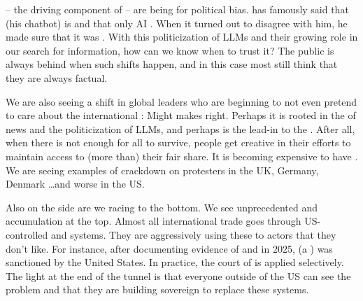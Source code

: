  -- the driving component of  -- are being  for political bias.  has famously said that  (his chatbot) is  and that only AI . When it turned out to disagree with him, he made sure that it was . With this politicization of LLMs and their growing role in our search for information, how can we know when to trust it? The public is always behind when such shifts happen, and in this case most still think that they are always factual.

We are also seeing a shift in global leaders who are beginning to not even pretend to care about the international : Might makes right. Perhaps it is rooted in the  of news and the politicization of LLMs, and perhaps is the lead-in to the . After all, when there is not enough  for all to survive, people get creative in their efforts to maintain access to (more than) their fair share. It is becoming expensive to have . We are seeing examples of  crackdown on protesters in the UK, Germany, Denmark \ldots and worse in the US.

Also on the  side are we racing to the bottom. We see unprecedented  and  accumulation at the top. Almost all international trade goes through US-controlled  and  systems. They are aggressively using these to  actors that they don't like. For instance, after documenting evidence of  and  in 2025,  (a ) was sanctioned by the United States. In practice, the court of  is applied selectively. The light at the end of the tunnel is that everyone outside of the US can see the problem and that they are building sovereign  to replace these systems.

